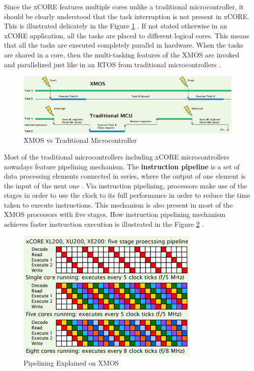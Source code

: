 Since the xCORE features multiple cores unlike a traditional microcontroller, it should be clearly understood that the task interruption is not present in xCORE. This is illustrated delicately in the Figure \ref{fig:xmosvstraditional} \cite{xmosflyer}. If not stated otherwise in an xCORE application, all the tasks are placed to different logical cores. This means that all the tasks are executed completely parallel in hardware. When the tasks are shared in a core, then the multi-tasking features of the XMOS are invoked and parallelized just like in an RTOS from traditional microcontrollers \cite{xmosflyer}.
\begin{figure}[!ht]
	\centering
	\captionsetup{justification=centering}
	\includegraphics[width=\textwidth]{content/images/xmosvstraditional.png}
	\caption{XMOS vs Traditional Microcontroller \cite{xmosflyer}}
	\label{fig:xmosvstraditional}
\end{figure}

Most of the traditional microcontrollers including xCORE microcontrollers nowadays feature pipelining mechanism. The \textbf{instruction pipeline} is a set of data processing elements connected in series, where the output of one element is the input of the next one \cite{pipelinebook}. Via instruction pipelining, processors make use of the stages in order to use the clock to its full performance in order to reduce the time taken to execute instructions. This mechanism is also present in most of the XMOS processors with five stages. How instruction pipelining mechanism achieves faster instruction execution is illustrated in the Figure \ref{fig:pipeline} \cite{xmosflyer}.
\begin{figure}[!ht]
	\centering
	\captionsetup{justification=centering}
	\includegraphics[scale=0.9]{content/images/pipeline.png}
	\caption{Pipelining Explained on XMOS \cite{xmosflyer}}
	\label{fig:pipeline}
\end{figure}

